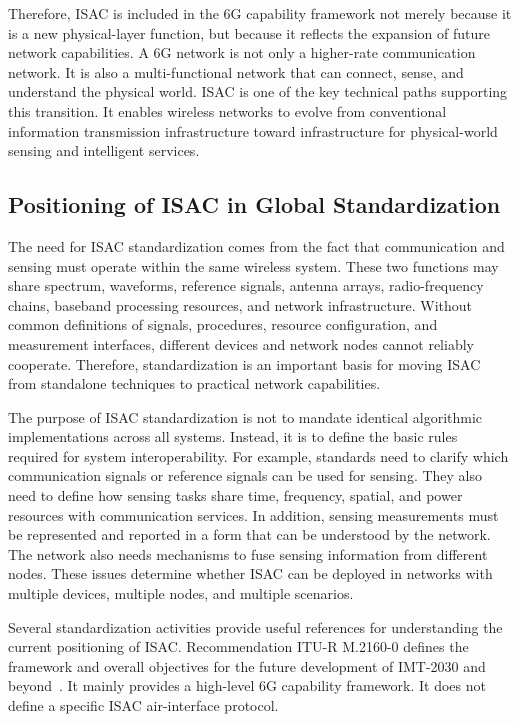 Therefore, ISAC is included in the 6G capability framework not merely because it is a new physical-layer function, but because it reflects the expansion of future network capabilities.
A 6G network is not only a higher-rate communication network.
It is also a multi-functional network that can connect, sense, and understand the physical world.
ISAC is one of the key technical paths supporting this transition.
It enables wireless networks to evolve from conventional information transmission infrastructure toward infrastructure for physical-world sensing and intelligent services.
 
\subsection{Positioning of ISAC in Global Standardization}

The need for ISAC standardization comes from the fact that communication and sensing must operate within the same wireless system.
These two functions may share spectrum, waveforms, reference signals, antenna arrays, radio-frequency chains, baseband processing resources, and network infrastructure.
Without common definitions of signals, procedures, resource configuration, and measurement interfaces, different devices and network nodes cannot reliably cooperate.
Therefore, standardization is an important basis for moving ISAC from standalone techniques to practical network capabilities.

The purpose of ISAC standardization is not to mandate identical algorithmic implementations across all systems.
Instead, it is to define the basic rules required for system interoperability.
For example, standards need to clarify which communication signals or reference signals can be used for sensing.
They also need to define how sensing tasks share time, frequency, spatial, and power resources with communication services.
In addition, sensing measurements must be represented and reported in a form that can be understood by the network.
The network also needs mechanisms to fuse sensing information from different nodes.
These issues determine whether ISAC can be deployed in networks with multiple devices, multiple nodes, and multiple scenarios.

Several standardization activities provide useful references for understanding the current positioning of ISAC.
Recommendation ITU-R M.2160-0 defines the framework and overall objectives for the future development of IMT-2030 and beyond~\cite{ITU_M2160_2023}.
It mainly provides a high-level 6G capability framework.
It does not define a specific ISAC air-interface protocol.

